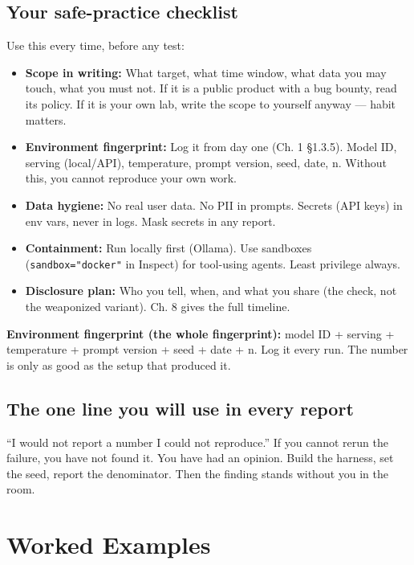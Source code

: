 \subsection{Your safe-practice checklist}
Use this every time, before any test:

\begin{itemize}
\item \textbf{Scope in writing:} What target, what time window, what data you may touch, what you must not. If it is a public product with a bug bounty, read its policy. If it is your own lab, write the scope to yourself anyway — habit matters.
\item \textbf{Environment fingerprint:} Log it from day one (Ch. 1 §1.3.5). Model ID, serving (local/API), temperature, prompt version, seed, date, n. Without this, you cannot reproduce your own work.
\item \textbf{Data hygiene:} No real user data. No PII in prompts. Secrets (API keys) in env vars, never in logs. Mask secrets in any report.
\item \textbf{Containment:} Run locally first (Ollama). Use sandboxes (\texttt{sandbox="docker"} in Inspect) for tool-using agents. Least privilege always.
\item \textbf{Disclosure plan:} Who you tell, when, and what you share (the check, not the weaponized variant). Ch. 8 gives the full timeline.
\end{itemize}

\begin{defbox}
\textbf{Environment fingerprint (the whole fingerprint):} model ID + serving + temperature + prompt version + seed + date + n. Log it every run. The number is only as good as the setup that produced it.
\end{defbox}

\subsection{The one line you will use in every report}
``I would not report a number I could not reproduce.'' If you cannot rerun the failure, you have not found it. You have had an opinion. Build the harness, set the seed, report the denominator. Then the finding stands without you in the room.

\section{Worked Examples}
\tierP

